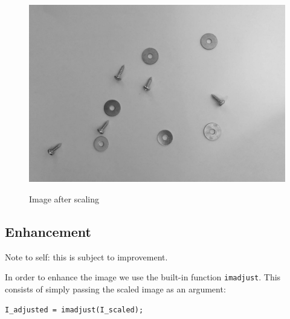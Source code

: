 \documentclass{article}
\begin{document}
\begin{figure}[hbt!]
\begin{center}
\begin{minipage}{0.4\textwidth}
	\caption{Image after scaling}
	\includegraphics[width=\textwidth]{scaled}
	\label{fig:scaled}
\end{minipage}
\end{center}
\end{figure}

\subsection{Enhancement}
Note to self: this is subject to improvement.

In order to enhance the image we use the built-in function 
\texttt{imadjust}. This consists of simply passing the scaled image
as an argument:

\begin{verbatim}
I_adjusted = imadjust(I_scaled);
\end{verbatim}
\end{document}
